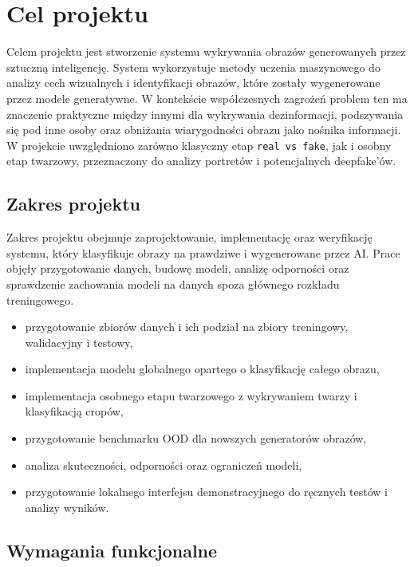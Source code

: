 \newpage
\section{Cel projektu}

Celem projektu jest stworzenie systemu wykrywania obrazów generowanych przez sztuczną inteligencję. System wykorzystuje metody uczenia maszynowego do analizy cech wizualnych i identyfikacji obrazów, które zostały wygenerowane przez modele generatywne. W kontekście współczesnych zagrożeń problem ten ma znaczenie praktyczne między innymi dla wykrywania dezinformacji, podszywania się pod inne osoby oraz obniżania wiarygodności obrazu jako nośnika informacji. W projekcie uwzględniono zarówno klasyczny etap \texttt{real vs fake}, jak i osobny etap twarzowy, przeznaczony do analizy portretów i potencjalnych deepfake'ów.

\subsection{Zakres projektu}

Zakres projektu obejmuje zaprojektowanie, implementację oraz weryfikację systemu, który klasyfikuje obrazy na prawdziwe i wygenerowane przez AI. Prace objęły przygotowanie danych, budowę modeli, analizę odporności oraz sprawdzenie zachowania modeli na danych spoza głównego rozkładu treningowego.

\begin{itemize}
    \item przygotowanie zbiorów danych i ich podział na zbiory treningowy, walidacyjny i testowy,
    \item implementacja modelu globalnego opartego o klasyfikację całego obrazu,
    \item implementacja osobnego etapu twarzowego z wykrywaniem twarzy i klasyfikacją cropów,
    \item przygotowanie benchmarku OOD dla nowszych generatorów obrazów,
    \item analiza skuteczności, odporności oraz ograniczeń modeli,
    \item przygotowanie lokalnego interfejsu demonstracyjnego do ręcznych testów i analizy wyników.
\end{itemize}

\newpage
\subsection{Wymagania funkcjonalne}

